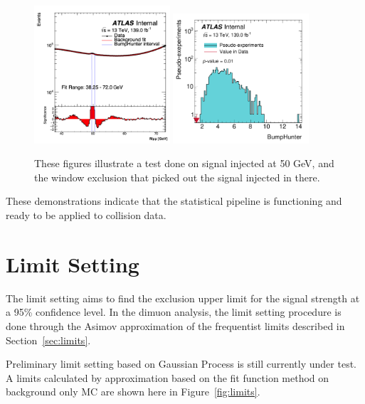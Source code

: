 \begin{figure}[!htb]
    \begin{center}
        \includegraphics[width=0.45\textwidth]{figures/chapter_dimuon/SearchBump}
        \includegraphics[width=0.45\textwidth]{figures/chapter_dimuon/bumpHunterStatPlot_bump}
        \caption{
        These figures illustrate a test done on signal injected at 50 GeV, and the window exclusion that picked out the signal injected in there.}
        \label{fig:searchbump}
    \end{center}
\end{figure}
\FloatBarrier

These demonstrations indicate that the statistical pipeline is functioning and ready to be applied to collision data.

\section{Limit Setting}
The limit setting aims to find the exclusion upper limit for the signal strength at a 95\% confidence level. In the dimuon analysis, the limit setting procedure is done through the Asimov approximation of the frequentist limits described in Section~\ref{sec:limits}.

Preliminary limit setting based on Gaussian Process is still currently under test. A limits calculated by approximation based on the fit function method on background only MC are shown here in Figure~\ref{fig:limits}.

